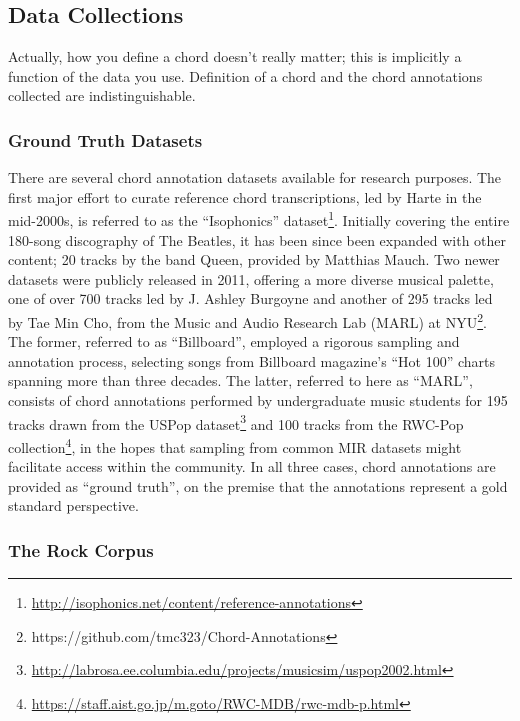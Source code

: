 \documentclass{article}
\begin{document}
\subsection{Data Collections}\label{subsec:data}

Actually, how you define a chord doesn't really matter; this is implicitly a function of the data you use.
Definition of a chord and the chord annotations collected are indistinguishable.

\subsubsection{Ground Truth Datasets}

There are several chord annotation datasets available for research purposes.
The first major effort to curate reference chord transcriptions, led by Harte in the mid-2000s, is referred to as the ``Isophonics'' dataset\footnote{\url{http://isophonics.net/content/reference-annotations}}.
Initially covering the entire 180-song discography of The Beatles, it has been since been expanded with other content;
 20 tracks by the band Queen, provided by Matthias Mauch.
Two newer datasets were publicly released in 2011, offering a more diverse musical palette, one of over 700 tracks led by J. Ashley Burgoyne \cite{Burgoyne2011Expert} and another of 295 tracks led by Tae Min Cho, from the Music and Audio Research Lab (MARL) at NYU\footnote{{https://github.com/tmc323/Chord-Annotations}}.
The former, referred to as ``Billboard'', employed a rigorous sampling and annotation process, selecting songs from Billboard magazine's ``Hot 100'' charts spanning more than three decades.
The latter, referred to here as ``MARL'', consists of chord annotations performed by undergraduate music students for 195 tracks drawn from the USPop dataset\footnote{\url{http://labrosa.ee.columbia.edu/projects/musicsim/uspop2002.html}} and 100 tracks from the RWC-Pop collection\footnote{\url{https://staff.aist.go.jp/m.goto/RWC-MDB/rwc-mdb-p.html}}, in the hopes that sampling from common MIR datasets might facilitate access within the community.
In all three cases, chord annotations are provided as ``ground truth'', on the premise that the annotations represent a gold standard perspective.


\subsubsection{The Rock Corpus}
\end{document}
